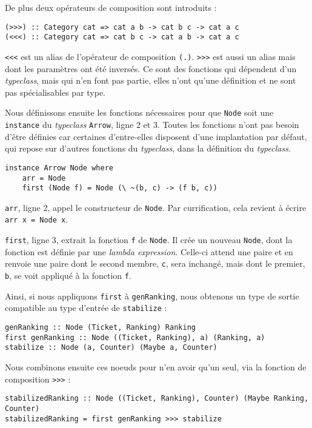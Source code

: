 \documentclass{llncs}
\newcommand{\Arrv}{\lstinline{Arrow}, }
\begin{document}
De plus deux opérateurs de composition sont introduits :
\begin{lstlisting}
(>>>) :: Category cat => cat a b -> cat b c -> cat a c
(<<<) :: Category cat => cat b c -> cat a b -> cat a c
\end{lstlisting}

\lstinline{<<<} est un alias de l'opérateur de composition \lstinline{(.)}.
\lstinline{>>>} est aussi un alias mais dont les paramètres ont été inversés.
Ce sont des fonctions qui dépendent d'un \emph{typeclass}, mais qui n'en font pas
partie, elles n'ont qu'une définition et ne sont pas spécialisables par type.

Nous définissons ensuite les fonctions nécessaires pour que \lstinline{Node} soit
une \lstinline{instance} du \emph{typeclass} \Arrv ligne 2 et 3.
Toutes les fonctions n'ont pas besoin d'être définies car certaines d'entre-elles
disposent d'une implantation par défaut, qui repose sur d'autres fonctions du
\emph{typeclass}, dans la définition du \emph{typeclass}.

\begin{lstlisting}
instance Arrow Node where
    arr = Node
    first (Node f) = Node (\ ~(b, c) -> (f b, c))
\end{lstlisting}

\lstinline{arr}, ligne 2, appel le constructeur de \lstinline{Node}.
Par currification, cela revient à écrire \lstinline{arr x = Node x}.

\lstinline{first}, ligne 3, extrait la fonction \lstinline{f} de \lstinline{Node}.
Il crée un nouveau \lstinline{Node}, dont la fonction est définie par
une \emph{lambda expression}.
Celle-ci attend une paire et en renvoie une paire dont le second membre, \lstinline{c},
sera inchangé, mais dont le premier, \lstinline{b}, se voit appliqué à la fonction \lstinline{f}.

Ainsi, si nous appliquons \lstinline{first} à \lstinline{genRanking}, nous obtenons
un type de sortie compatible au type d'entrée de \lstinline{stabilize} :
\begin{lstlisting}
genRanking :: Node (Ticket, Ranking) Ranking
first genRanking :: Node ((Ticket, Ranking), a) (Ranking, a)
stabilize :: Node (a, Counter) (Maybe a, Counter)
\end{lstlisting}

Nous combinons ensuite ces noeuds pour n'en avoir qu'un seul, via la fonction
de composition \lstinline{>>>} :
\begin{lstlisting}
stabilizedRanking :: Node ((Ticket, Ranking), Counter) (Maybe Ranking, Counter)
stabilizedRanking = first genRanking >>> stabilize
\end{lstlisting}
\end{document}
